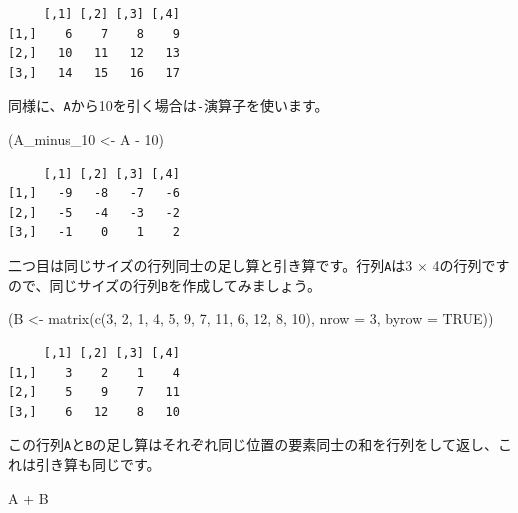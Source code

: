\documentclass[
  a4paper,
  pandoc,
  ja=standard,
  jafont=haranoaji]{bxjsbook}
\newenvironment{Shaded}{\begin{snugshade}}{\end{snugshade}}
\newcommand{\AttributeTok}[1]{\textcolor[rgb]{0.00,0.48,0.65}{#1}}
\newcommand{\ConstantTok}[1]{\textcolor[rgb]{0.56,0.35,0.01}{#1}}
\newcommand{\DecValTok}[1]{\textcolor[rgb]{0.68,0.00,0.00}{#1}}
\newcommand{\FunctionTok}[1]{\textcolor[rgb]{0.28,0.35,0.67}{#1}}
\newcommand{\NormalTok}[1]{\textcolor[rgb]{0.00,0.48,0.65}{#1}}
\newcommand{\OtherTok}[1]{\textcolor[rgb]{0.00,0.48,0.65}{#1}}
\newcommand{\SpecialCharTok}[1]{\textcolor[rgb]{0.37,0.37,0.37}{#1}}
\begin{document}
\begin{verbatim}
     [,1] [,2] [,3] [,4]
[1,]    6    7    8    9
[2,]   10   11   12   13
[3,]   14   15   16   17
\end{verbatim}

同様に、\texttt{A}から10を引く場合は\texttt{-}演算子を使います。

\begin{Shaded}
\begin{Highlighting}[numbers=left,,]
\NormalTok{(A\_minus\_10 }\OtherTok{\textless{}{-}}\NormalTok{ A }\SpecialCharTok{{-}} \DecValTok{10}\NormalTok{)}
\end{Highlighting}
\end{Shaded}

\begin{verbatim}
     [,1] [,2] [,3] [,4]
[1,]   -9   -8   -7   -6
[2,]   -5   -4   -3   -2
[3,]   -1    0    1    2
\end{verbatim}

二つ目は同じサイズの行列同士の足し算と引き算です。行列\texttt{A}は3
\(\times\)
4の行列ですので、同じサイズの行列\texttt{B}を作成してみましょう。

\begin{Shaded}
\begin{Highlighting}[numbers=left,,]
\NormalTok{(B }\OtherTok{\textless{}{-}} \FunctionTok{matrix}\NormalTok{(}\FunctionTok{c}\NormalTok{(}\DecValTok{3}\NormalTok{, }\DecValTok{2}\NormalTok{, }\DecValTok{1}\NormalTok{, }\DecValTok{4}\NormalTok{, }\DecValTok{5}\NormalTok{, }\DecValTok{9}\NormalTok{, }\DecValTok{7}\NormalTok{, }\DecValTok{11}\NormalTok{, }\DecValTok{6}\NormalTok{, }\DecValTok{12}\NormalTok{, }\DecValTok{8}\NormalTok{, }\DecValTok{10}\NormalTok{), }
             \AttributeTok{nrow =} \DecValTok{3}\NormalTok{, }\AttributeTok{byrow =} \ConstantTok{TRUE}\NormalTok{))}
\end{Highlighting}
\end{Shaded}

\begin{verbatim}
     [,1] [,2] [,3] [,4]
[1,]    3    2    1    4
[2,]    5    9    7   11
[3,]    6   12    8   10
\end{verbatim}

この行列\texttt{A}と\texttt{B}の足し算はそれぞれ同じ位置の要素同士の和を行列をして返し、これは引き算も同じです。

\begin{Shaded}
\begin{Highlighting}[numbers=left,,]
\NormalTok{A }\SpecialCharTok{+}\NormalTok{ B}
\end{Highlighting}
\end{Shaded}
\end{document}
